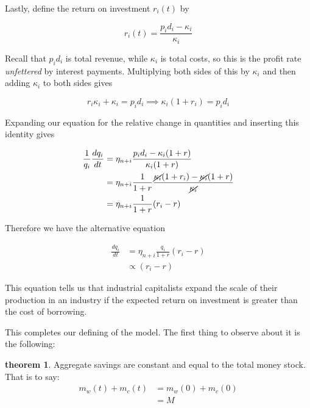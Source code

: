 \documentclass{article}
\theoremstyle{definition}
\newtheorem{theorem}{theorem}[section]
\begin{document}
Lastly, define the return on investment $r_i(t)$ by

\begin{equation}
    r_i(t) = \frac{p_id_i-\kappa_i}{\kappa_i}
\end{equation}

Recall that $p_id_i$ is total revenue, while $\kappa_i$ is total costs, so this is the profit rate \emph{unfettered} by interest payments. Multiplying both sides of this by $\kappa_i$ and then adding $\kappa_i$ to both sides gives

\begin{equation}
    r_i\kappa_i +\kappa_i = p_id_i \implies \kappa_i(1+r_i) = p_id_i
\end{equation}

Expanding our equation for the relative change in quantities and inserting this identity gives

\begin{align}
    \frac{1}{q_i}\frac{dq_i}{dt} &= \eta_{n+i}\frac{p_id_i-\kappa_i(1+r)}{\kappa_i(1+r)} \label{quantity-diff-eq} \\
    &= \eta_{n+i}\frac{1}{1+r}\frac{\cancel{\kappa_i}(1+r_i)-\cancel{\kappa_i}(1+r)}{\cancel{\kappa_i}} \\
    &= \eta_{n+i}\frac{1}{1+r}(r_i-r) 
\end{align}

Therefore we have the alternative equation

\begin{align}
    \frac{dq_i}{dt} &= \eta_{n+i}\frac{q_i}{1+r}(r_i-r) \\
                    &\propto (r_i-r)
\end{align}

This equation tells us that industrial capitalists expand the scale of their production in an industry if the expected return on investment is greater than the cost of borrowing. 

This completes our defining of the model. The first thing to observe about it is the following:

\begin{theorem}
    Aggregate savings are constant and equal to the total money stock. That is to say:
    \begin{align}
        m_w(t)+m_c(t) &= m_w(0) + m_c(0) \\
                      &= M
    \end{align}
\end{theorem}
\end{document}
